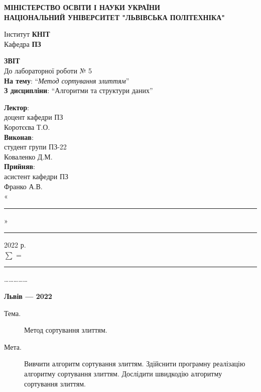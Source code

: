 \documentclass{article}
\newcommand\subject{Алгоритми та структури даних}
\newcommand\lecturer{доцент кафедри ПЗ\\Коротєєва Т.О.}
\newcommand\teacher{асистент кафедри ПЗ\\Франко А.В.}
\newcommand\mygroup{ПЗ-22}
\newcommand\lab{5}
\newcommand\theme{Метод сортування злиттям}
\newcommand\purpose{Вивчити алгоритм сортування злиттям. Здійснити програмну реалізацію алгоритму сортування злиттям. Дослідити швидкодію алгоритму сортування злиттям}
\begin{document}
	\begin{normalsize}
		\begin{titlepage}
			\thispagestyle{empty}
			\begin{center}
				\textbf{МІНІСТЕРСТВО ОСВІТИ І НАУКИ УКРАЇНИ\\
					НАЦІОНАЛЬНИЙ УНІВЕРСИТЕТ "ЛЬВІВСЬКА ПОЛІТЕХНІКА"}
			\end{center}
			\begin{flushright}
				Інститут \textbf{КНІТ}\\
				Кафедра \textbf{ПЗ}
			\end{flushright}
			\vspace{200pt}
			\begin{center}
				\textbf{ЗВІТ}\\
				\vspace{10pt}
				До лабораторної роботи № \lab\\
				\textbf{На тему}: “\textit{\theme}”\\
				\textbf{З дисципліни}: “\subject”
			\end{center}
			\vspace{112pt}
			\begin{flushright}
				
				\textbf{Лектор}:\\
				\lecturer\\
				\vspace{28pt}
				\textbf{Виконав}:\\
				
				студент групи \mygroup\\
				Коваленко Д.М.\\
				\vspace{28pt}
				\textbf{Прийняв}:\\
				
				\teacher\\
				
				\vspace{28pt}
				«\rule{1cm}{0.15mm}» \rule{1.5cm}{0.15mm} 2022 р.\\
				$\sum$ = \rule{1cm}{0.15mm}……………\\
				
			\end{flushright}
			\vspace{\fill}
			\begin{center}
				\textbf{Львів — 2022}
			\end{center}
		\end{titlepage}
		
		\begin{description}
			\item[Тема.] \theme.
			\item[Мета.] \purpose.
		\end{description}
		

\end{normalsize}
\end{document}
